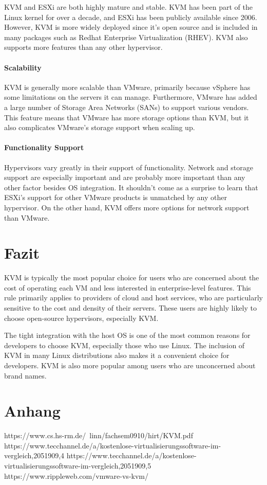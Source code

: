 \documentclass[14pt]{extreport}
\begin{document}
KVM and ESXi are both highly mature and stable. KVM has been part of the Linux kernel for over a decade, and ESXi has been publicly available since 2006. However, KVM is more widely deployed since it’s open source and is included in many packages such as Redhat Enterprise Virtualization (RHEV). KVM also supports more features than any other hypervisor.
\subsubsection{Scalability}

KVM is generally more scalable than VMware, primarily because vSphere has some limitations on the servers it can manage. Furthermore, VMware has added a large number of Storage Area Networks (SANs) to support various vendors. This feature means that VMware has more storage options than KVM, but it also complicates VMware’s storage support when scaling up.
\subsubsection{Functionality Support}

Hypervisors vary greatly in their support of functionality. Network and storage support are especially important and are probably more important than any other factor besides OS integration. It shouldn’t come as a surprise to learn that ESXi’s support for other VMware products is unmatched by any other hypervisor. On the other hand, KVM offers more options for network support than VMware.


\chapter{Fazit}
KVM is typically the most popular choice for users who are concerned about the cost of operating each VM and less interested in enterprise-level features. This rule primarily applies to providers of cloud and host services, who are particularly sensitive to the cost and density of their servers. These users are highly likely to choose open-source hypervisors, especially KVM.

The tight integration with the host OS is one of the most common reasons for developers to choose KVM, especially those who use Linux. The inclusion of KVM in many Linux distributions also makes it a convenient choice for developers. KVM is also more popular among users who are unconcerned about brand names.
\chapter{Anhang}
\printbibliography


https://www.cs.hs-rm.de/~linn/fachsem0910/hirt/KVM.pdf
https://www.tecchannel.de/a/kostenlose-virtualisierungssoftware-im-vergleich,2051909,4
https://www.tecchannel.de/a/kostenlose-virtualisierungssoftware-im-vergleich,2051909,5
https://www.rippleweb.com/vmware-vs-kvm/
\end{document}
